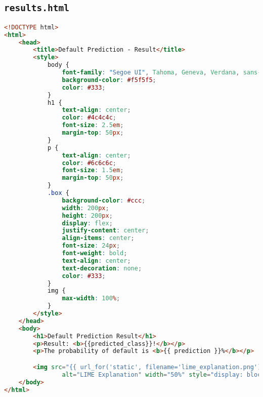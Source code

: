\subsection{\lstinline{results.html}}

\begin{lstlisting}[language=HTML, basicstyle=\footnotesize\ttfamily]
<!DOCTYPE html>
<html>
	<head>
		<title>Default Prediction - Result</title>
		<style>
			body {
				font-family: "Segoe UI", Tahoma, Geneva, Verdana, sans-serif;
				background-color: #f5f5f5;
				color: #333;
			}
			h1 {
				text-align: center;
				color: #4c4c4c;
				font-size: 2.5em;
				margin-top: 50px;
			}
			p {
				text-align: center;
				color: #6c6c6c;
				font-size: 1.5em;
				margin-top: 50px;
			}
			.box {
				background-color: #ccc;
				width: 200px;
				height: 200px;
				display: flex;
				justify-content: center;
				align-items: center;
				font-size: 24px;
				font-weight: bold;
				text-align: center;
				text-decoration: none;
				color: #333;
			}
			img {
				max-width: 100%;
			}
		</style>
	</head>
	<body>
		<h1>Default Prediction Result</h1>
		<p>Result: <b>{{predicted_class}}!</b></p>
		<p>The probability of default is <b>{{ prediction }}%</b></p>

		<img src="{{ url_for('static', filename='lime_explanation.png') }}" 
				alt="LIME Explanation" width="50%" style="display: block; margin: auto;" />
	</body>
</html>	
\end{lstlisting}

\restoregeometry
\fancyheadoffset{0pt}